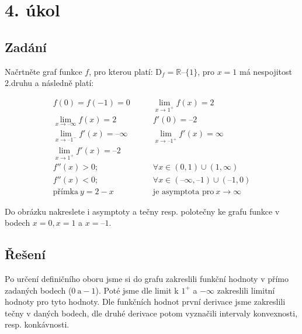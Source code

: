 \section{4. úkol}
\subsection{Zadání}
Načrtněte graf funkce $f$,
pro kterou platí: $\text{D}_{f} = \mathbb{R} – \{1\}$, pro $x = 1$ má nespojitost 2.druhu a následně platí:

\begin{align*}
f(0) = f(-1) = 0&\qquad \lim_{x\rightarrow 1^{+}} f(x) = 2\\
\lim_{x\rightarrow –\infty} f(x) = 2&\qquad f'(0) = –2\\
\lim_{x\rightarrow –1^{-}} f'(x) = – \infty&\qquad \lim_{x\rightarrow –1^{+}} f'(x) = \infty\\
\lim_{x\rightarrow 1^{+}} f'(x) = – 2&\\
f''(x) > 0;&\qquad\forall x \in (0, 1) \cup (1, \infty)\\
f''(x) < 0;&\qquad\forall x \in (–\infty, –1) \cup (–1,0)\\
\text{přímka}\ y = 2 - x &\qquad\text{je asymptota pro}\ x\rightarrow \infty
\end{align*}

Do obrázku nakreslete i asymptoty a tečny resp. polotečny ke grafu funkce v bodech $x = 0, x = 1$ a $x = –1$.

\subsection{Řešení}
Po určení definičního oboru jsme si do grafu zakreslili funkční hodnoty v přímo zadaných bodech ($0\ \text{a} -1$). Poté jsme dle limit k $1^+$ a $-\infty$ zakreslili limitní hodnoty pro tyto hodnoty. Dle funkčních hodnot první derivace jsme zakreslili tečny v daných bodech, dle druhé derivace potom vyznačili intervaly konvexnosti, resp. konkávnosti.
